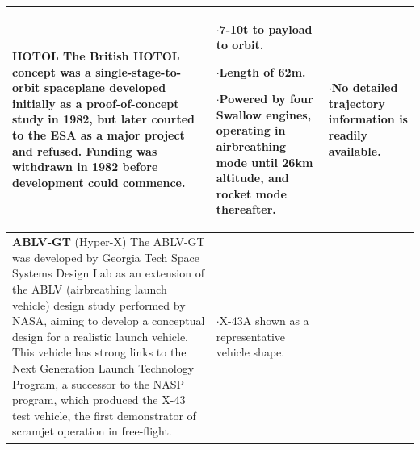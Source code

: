 {\begin{landscape}
\begin{xltabular}{\linewidth}{|X|X|X|}
 \\ 
 \hline \small \textbf{HOTOL}\cite{Aberleen}\newline\newline
 The British HOTOL concept was a single-stage-to-orbit spaceplane developed initially as a proof-of-concept study in 1982, but later courted to the ESA as a major project and refused. Funding was withdrawn in 1982 before development could commence. 
 & \small
 $\cdot$7-10t to payload to orbit.
 
 $\cdot$Length of 62m.
 
 $\cdot$Powered by four Swallow engines, operating in airbreathing mode until 26km altitude, and rocket mode thereafter.
 & \small
 $\cdot$No detailed trajectory information is readily available. 
 \\
\hline \small\textbf{ABLV-GT} (Hyper-X)\cite{Bradford2000, HyperX} 
\newline \newline 
The ABLV-GT was developed by Georgia Tech Space Systems Design Lab as an extension of the ABLV (airbreathing launch vehicle) design study performed by NASA, aiming to develop a conceptual design for a realistic launch vehicle. This vehicle has strong links to the Next Generation Launch Technology Program, a successor to the NASP program, which produced the X-43 test vehicle, the first demonstrator of scramjet operation in free-flight.
&
\small
{}

$\cdot$X-43A shown as a representative vehicle shape.


\end{xltabular}
\end{landscape}}
